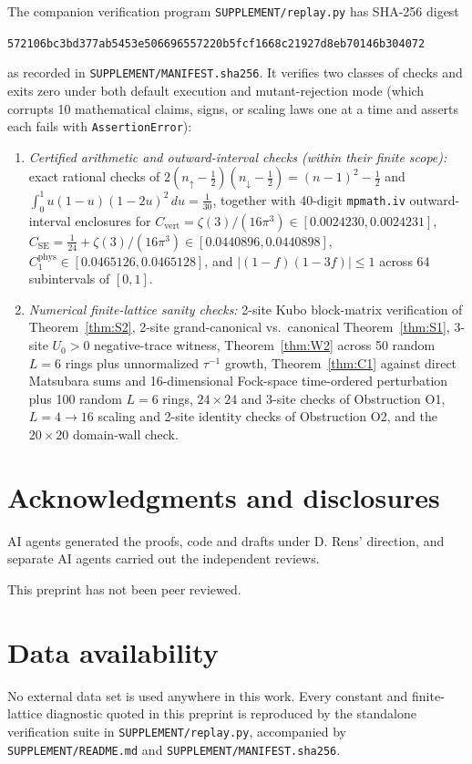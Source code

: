 \documentclass[11pt]{article}
\theoremstyle{definition}
\theoremstyle{remark}
\DeclareMathOperator{\phys}{phys}
\DeclareMathOperator{\vertop}{vert}
\DeclareMathOperator{\SE}{SE}
\begin{document}
The companion verification program \texttt{SUPPLEMENT/replay.py} has SHA-256 digest
\begin{center}
\footnotesize\texttt{572106bc3bd377ab5453e506696557220b5fcf1668c21927d8eb70146b304072}
\end{center}
\noindent as recorded in \texttt{SUPPLEMENT/MANIFEST.sha256}. It verifies two classes of checks and exits zero under both default execution and mutant-rejection mode (which corrupts 10 mathematical claims, signs, or scaling laws one at a time and asserts each fails with \texttt{AssertionError}):
\begin{enumerate}[label=(\arabic*),leftmargin=2.2em]
\item \emph{Certified arithmetic and outward-interval checks (within their finite scope):} exact rational checks of $2(n_\uparrow-\frac{1}{2})(n_\downarrow-\frac{1}{2}) = (n-1)^2 - \frac{1}{2}$ and $\int_0^1 u(1-u)(1-2u)^2\,du = \frac{1}{30}$, together with 40-digit \texttt{mpmath.iv} outward-interval enclosures for $C_{\vertop} = \zeta(3)/(16\pi^3) \in [0.0024230, 0.0024231]$, $C_{\SE} = \frac{1}{24} + \zeta(3)/(16\pi^3) \in [0.0440896, 0.0440898]$, $C_1^{\phys} \in [0.0465126, 0.0465128]$, and $|(1-f)(1-3f)| \le 1$ across 64 subintervals of $[0,1]$.
\item \emph{Numerical finite-lattice sanity checks:} 2-site Kubo block-matrix verification of Theorem~\ref{thm:S2}, 2-site grand-canonical vs.\ canonical Theorem~\ref{thm:S1}, 3-site $U_0>0$ negative-trace witness, Theorem~\ref{thm:W2} across 50 random $L=6$ rings plus unnormalized $\tau^{-1}$ growth, Theorem~\ref{thm:C1} against direct Matsubara sums and 16-dimensional Fock-space time-ordered perturbation plus 100 random $L=6$ rings, $24\times 24$ and 3-site checks of Obstruction O1, $L=4\to 16$ scaling and 2-site identity checks of Obstruction O2, and the $20\times 20$ domain-wall check.
\end{enumerate}

\section*{Acknowledgments and disclosures}

AI agents generated the proofs, code and drafts under D. Rens' direction, and separate AI agents carried out the independent reviews.

This preprint has not been peer reviewed.

\section*{Data availability}

No external data set is used anywhere in this work. Every constant and finite-lattice diagnostic quoted in this preprint is reproduced by the standalone verification suite in \texttt{SUPPLEMENT/replay.py}, accompanied by \texttt{SUPPLEMENT/README.md} and \texttt{SUPPLEMENT/MANIFEST.sha256}.



\end{document}
